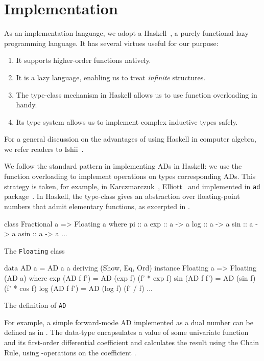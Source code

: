 \documentclass[./rims-smooth-paper.tex]{subfiles}
\begin{document}
\section{Implementation}
\label{sec:impl}
As an implementation language, we adopt a Haskell~\cite{haskell.org:2021tt}, a purely functional lazy programming language.
It has several virtues useful for our purpose:
\begin{enumerate}
\item It supports higher-order functions natively.
\item It is a lazy language, enabling us to treat \emph{infinite} structures.
\item The type-class mechanism in Haskell allows us to use function overloading in handy.
\item Its type system allows us to implement complex inductive types safely.
\end{enumerate}
For a general discussion on the advantages of using Haskell in computer algebra, we refer readers to Ishii~\cite{ISHII:2018ek}.

We follow the standard pattern in implementing ADs in Haskell: we use the function overloading to implement operations on types corresponding ADs.
This strategy is taken, for example, in Karczmarczuk~\cite{Karczmarczuk:2001ww}, Elliott~\cite{Elliott2009-beautiful-differentiation} and implemented in \texttt{ad} package~\cite{Kmett:2010aa}.
In Haskell, the  type-class gives an abstraction over floating-point numbers that admit elementary functions, as excerpted in .
\begin{listing}[tbp]
\begin{code}
class Fractional a => Floating a where
  pi :: a
  exp :: a -> a
  log :: a -> a
  sin :: a -> a
  asin :: a -> a
  ...
\end{code}
\caption{The \texttt{Floating} class}
\label{lst:cls-floating}
\end{listing}
\begin{listing}[tbp]
\begin{code}
  data AD a = AD a a deriving (Show, Eq, Ord)
  instance Floating a => Floating (AD a) where
    exp (AD f f') = AD (exp f) (f' * exp f)
    sin (AD f f') = AD (sin f) (f' * cos f)
    log (AD f f') = AD (log f) (f' / f)
    ...
\end{code}
\caption{The definition of \texttt{AD}\label{lst:def-AD}}
\end{listing}

For example, a simple forward-mode AD implemented as a dual number can be defined as in .
The data-type  encapsulates a value of some univariate function and its first-order differential coefficient and calculates the result using the Chain Rule, using -operations on the coefficient .
\end{document}

